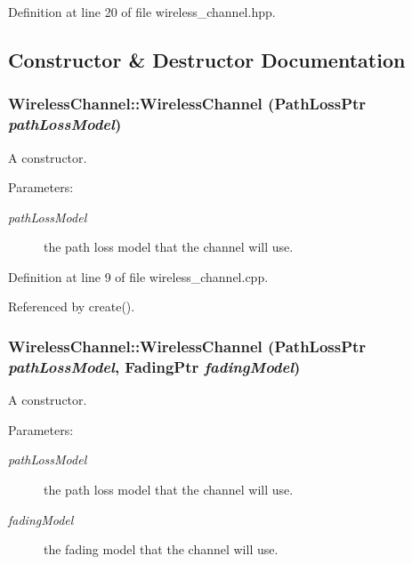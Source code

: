 Definition at line 20 of file wireless\_\-channel.hpp.

\subsection{Constructor \& Destructor Documentation}
\subsubsection{\setlength{\rightskip}{0pt plus 5cm}Wireless\-Channel::Wireless\-Channel (Path\-Loss\-Ptr {\em path\-Loss\-Model})\hspace{0.3cm}{\tt  [protected]}}\label{classWirelessChannel_7d4848d7d49d3c90883e901b710feb5a}


A constructor. 

\begin{Desc}
\item[Parameters:]
\begin{description}
\item[{\em path\-Loss\-Model}]the path loss model that the channel will use. \end{description}
\end{Desc}


Definition at line 9 of file wireless\_\-channel.cpp.

Referenced by create().
\subsubsection{\setlength{\rightskip}{0pt plus 5cm}Wireless\-Channel::Wireless\-Channel (Path\-Loss\-Ptr {\em path\-Loss\-Model}, Fading\-Ptr {\em fading\-Model})\hspace{0.3cm}{\tt  [protected]}}\label{classWirelessChannel_3d6e95f3cd66299d212f42c32f6b637a}


A constructor. 

\begin{Desc}
\item[Parameters:]
\begin{description}
\item[{\em path\-Loss\-Model}]the path loss model that the channel will use. \item[{\em fading\-Model}]the fading model that the channel will use. \end{description}
\end{Desc}


